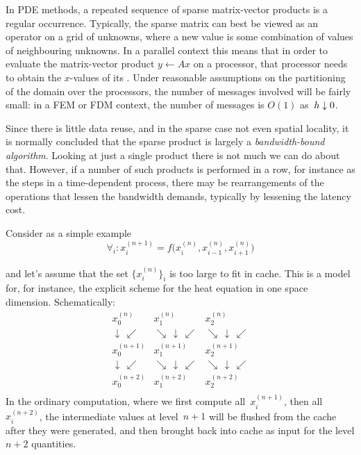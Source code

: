 
In \ac{PDE} methods, a repeated sequence of sparse matrix-vector products
is a regular occurrence.
Typically, the sparse matrix can best be viewed as an operator
on a grid of unknowns, where a new value is some combination of values
of neighbouring unknowns.
In a parallel context this means that in order to evaluate the matrix-vector
product $y\leftarrow Ax$ on a processor, that processor needs to obtain the $x$-values
of its . Under reasonable assumptions on the partitioning
of the domain over the processors, the number of messages involved will be fairly
small:
in a \ac{FEM} or \ac{FDM} context,
the number of messages is $O(1)$ as~$h\downarrow\nobreak 0$.

Since there is little data reuse, and in the sparse case not even 
spatial locality, it is normally concluded that the sparse
product is largely a \emph{bandwidth-bound algorithm}. 
Looking at just a
single product there is not much we can do about that. 
However, 
if a number of such products is performed in a row, for instance as the steps
in a time-dependent process, there may be rearrangements
of the operations that lessen the bandwidth demands, typically by lessening the
latency cost.

Consider as a simple example
\begin{equation}
\forall_i\colon x^{(n+1)}_i = f\bigl( x^{(n)}_i, x^{(n)}_{i-1}, x^{(n)}_{i+1} \bigr)
\label{eq:3p-average}
\end{equation}

and let's assume that the set $\{x^{(n)}_i\}_i$ is too large to fit 
in cache.
This is a model for, for instance, the explicit scheme for the heat
equation in one space dimension.
Schematically:
\[
\begin{array}{ccccc}
  x^{(n)}_0&x^{(n)}_1&x^{(n)}_2\\
  \downarrow\,\swarrow&\searrow\,\downarrow\,\swarrow&\searrow\,\downarrow\,\swarrow\\
  x^{(n+1)}_0&x^{(n+1)}_1&x^{(n+1)}_2\\
  \downarrow\,\swarrow&\searrow\,\downarrow\,\swarrow&\searrow\,\downarrow\,\swarrow\\
  x^{(n+2)}_0&x^{(n+2)}_1&x^{(n+2)}_2\\
\end{array}
\]
In the ordinary computation, where we first compute all~$x^{(n+1)}_i$, 
then all~$x^{(n+2)}_i$, the intermediate values at level~$n+1$
will be flushed from the cache
after they were generated, and then brought back into cache as input for the
level $n+2$ quantities.

